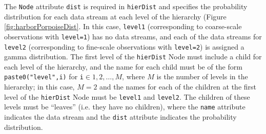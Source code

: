 \documentclass[12pt]{article}\usepackage[]{graphicx}\usepackage[]{color}
\begin{document}
\noindent The \verb|Node| attribute \verb|dist| is required in \verb|hierDist| and specifies the probability distribution for each data stream at each level of the hierarchy (Figure \ref{fig:harborPorpoiseDist}. In this case, \verb|level1| (corresponding to coarse-scale observations with \verb|level=1|) has no data streams, and each of the data streams for \verb|level2| (corresponding to fine-scale observations with \verb|level=2|) is assigned a gamma distribution. The first level of the \verb|hierDist| Node must include a child for each level of the hierarchy, and the name for each child must be of the form \verb|paste0("level",i)| for \verb|i|$\in{1,2,\ldots,M}$, where $M$ is the number of levels in the hierarchy; in this case, $M=2$ and the names for each of the children at the first level of the \verb|hierDist| Node must be \verb|level1| and \verb|level2|. The children of these levels must be ``leaves'' (i.e. they have no children), where the \verb|name| attribute indicates the data stream and the \verb|dist| attribute indicates the probability distribution.
\end{document}

